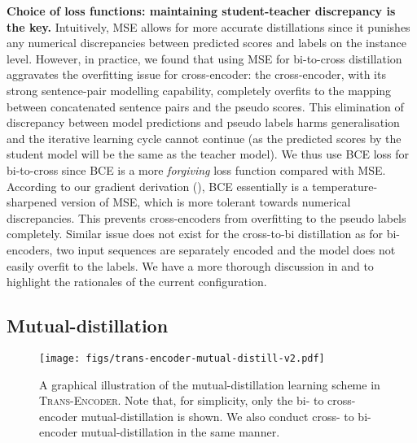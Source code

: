 \documentclass{article} \usepackage{iclr2021_conference,times}
\newcommand{\modelname}{\textsc{Trans-Encoder}\xspace}
\begin{document}
\textbf{Choice of loss functions: maintaining student-teacher discrepancy is the key.} Intuitively, MSE allows for more accurate distillations since it punishes any numerical discrepancies between predicted scores and labels on the instance level. However, in practice, we found that using MSE for bi-to-cross distillation aggravates the overfitting issue for cross-encoder: the cross-encoder, with its strong sentence-pair modelling capability, completely overfits to the mapping between concatenated sentence pairs and the pseudo scores. This elimination of discrepancy between model predictions and pseudo labels harms generalisation and the iterative learning cycle cannot continue (as the predicted scores by the student model will be the same as the teacher model). We thus use BCE loss for bi-to-cross since BCE is a more \textit{forgiving} loss function compared with MSE. According to our gradient derivation (), BCE essentially is a temperature-sharpened version of MSE, which is more tolerant towards numerical discrepancies. This prevents cross-encoders from overfitting to the pseudo labels completely. Similar issue does not exist for the cross-to-bi distillation as for bi-encoders, two input sequences are separately encoded and the model does not easily overfit to the labels. We have a more thorough discussion in  and  to highlight the rationales of the current configuration.

\subsection{Mutual-distillation}\label{sec:mutual_distill}

\begin{figure}
    \centering
    \texttt{[image: figs/trans-encoder-mutual-distill-v2.pdf]}
    \vspace{-1mm}
    \caption{A graphical illustration of the mutual-distillation learning scheme in \modelname. Note that, for simplicity, only the bi- to cross-encoder mutual-distillation is shown. We also conduct cross- to bi-encoder mutual-distillation in the same manner.}
    \label{fig:mutual_distill}
    \vspace{-2.0mm}
\end{figure}
\end{document}
